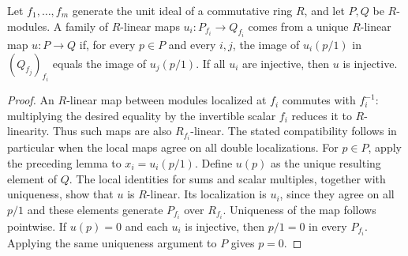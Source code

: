\begin{lemma}
\label{lem:linear-map-localization-descent}
\leanok
Let $f_1,\ldots,f_m$ generate the unit ideal of a commutative ring $R$,
and let $P,Q$ be $R$-modules. A family of $R$-linear maps
$u_i:P_{f_i}\to Q_{f_i}$ comes from a unique $R$-linear map $u:P\to Q$
if, for every $p\in P$ and every $i,j$, the image of $u_i(p/1)$
in $(Q_{f_j})_{f_i}$ equals the image of $u_j(p/1)$.
If all $u_i$ are injective, then $u$ is injective.
\end{lemma}
\begin{proof}
An $R$-linear map between modules localized at $f_i$ commutes with
$f_i^{-1}$: multiplying the desired equality by the invertible scalar
$f_i$ reduces it to $R$-linearity. Thus such maps are also
$R_{f_i}$-linear. The stated compatibility follows in particular when
the local maps agree on all double localizations.
For $p\in P$, apply the preceding lemma to $x_i=u_i(p/1)$.
Define $u(p)$ as the unique resulting element of $Q$. The local
identities for sums and scalar multiples, together with uniqueness,
show that $u$ is $R$-linear. Its localization is $u_i$, since they
agree on all $p/1$ and these elements generate $P_{f_i}$ over $R_{f_i}$.
Uniqueness of the map follows pointwise. If $u(p)=0$ and each $u_i$
is injective, then $p/1=0$ in every $P_{f_i}$. Applying the same
uniqueness argument to $P$ gives $p=0$.
\end{proof}

